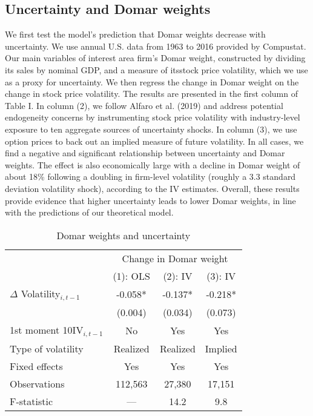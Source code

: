 \documentclass[11pt]{article}
\theoremstyle{definition}
\begin{document}
	\subsection{Uncertainty and Domar weights}
	We first test the model’s prediction that Domar weights decrease with uncertainty. We use annual U.S. data from 1963 to 2016 provided by Compustat. Our main variables of interest area firm’s Domar weight, constructed by dividing its sales by nominal GDP, and a measure of itsstock price volatility, which we use as a proxy for uncertainty. We then regress the change in Domar weight on the change in stock price volatility. The results are presented in the first column of Table I. In column (2), we follow Alfaro et al. (2019) and address potential endogeneity concerns by instrumenting stock price volatility with industry-level exposure to ten aggregate sources of uncertainty shocks. In column (3), we use option prices to back out an implied measure of future volatility. In all cases, we find a negative and significant relationship between uncertainty and Domar weights. The effect is also economically large with a decline in Domar weight of about 18\% following a doubling in firm-level volatility (roughly a 3.3 standard deviation volatility shock), according to the IV estimates. Overall, these results provide evidence that higher uncertainty leads to lower Domar weights, in line with the predictions of our theoretical model.
	
	\begin{table}[ht]
		\centering
		\caption{Domar weights and uncertainty}
		\begin{tabular}{lccc}
			\hline
			& \multicolumn{3}{c}{Change in Domar weight} \\
			\cline{2-4}
			& (1): OLS & (2): IV & (3): IV \\
			\hline
			$\Delta$ Volatility$_{i,t-1}$ & -0.058* & -0.137* & -0.218* \\
			& (0.004) & (0.034) & (0.073) \\
			1st moment 10IV$_{i,t-1}$ & No & Yes & Yes \\
			Type of volatility & Realized & Realized & Implied \\
			Fixed effects & Yes & Yes & Yes \\
			Observations & 112,563 & 27,380 & 17,151 \\
			F-statistic & --- & 14.2 & 9.8 \\
			\hline
		\end{tabular}
	\end{table}
	
\end{document}
